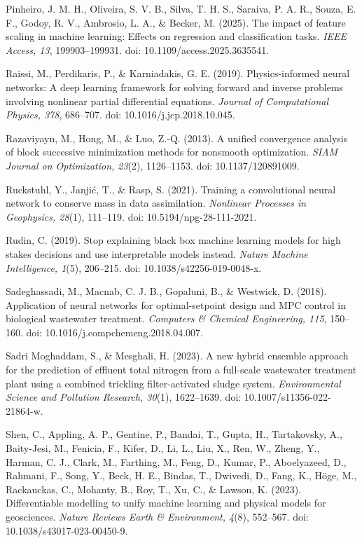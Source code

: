 \documentclass[a4paper,fleqn]{cas-sc}
\begin{document}
\noindent Pinheiro, J. M. H., Oliveira, S. V. B., Silva, T. H. S., Saraiva, P. A. R., Souza, E. F., Godoy, R. V., Ambrosio, L. A., \& Becker, M. (2025). The impact of feature scaling in machine learning: Effects on regression and classification tasks. \textit{IEEE Access, 13}, 199903--199931. doi: 10.1109/access.2025.3635541.

\noindent Raissi, M., Perdikaris, P., \& Karniadakis, G. E. (2019). Physics-informed neural networks: A deep learning framework for solving forward and inverse problems involving nonlinear partial differential equations. \textit{Journal of Computational Physics, 378}, 686--707. doi: 10.1016/j.jcp.2018.10.045.

\noindent Razaviyayn, M., Hong, M., \& Luo, Z.-Q. (2013). A unified convergence analysis of block successive minimization methods for nonsmooth optimization. \textit{SIAM Journal on Optimization, 23}(2), 1126--1153. doi: 10.1137/120891009.

\noindent Ruckstuhl, Y., Janji\'{c}, T., \& Rasp, S. (2021). Training a convolutional neural network to conserve mass in data assimilation. \textit{Nonlinear Processes in Geophysics, 28}(1), 111--119. doi: 10.5194/npg-28-111-2021.

\noindent Rudin, C. (2019). Stop explaining black box machine learning models for high stakes decisions and use interpretable models instead. \textit{Nature Machine Intelligence, 1}(5), 206--215. doi: 10.1038/s42256-019-0048-x.

\noindent Sadeghassadi, M., Macnab, C. J. B., Gopaluni, B., \& Westwick, D. (2018). Application of neural networks for optimal-setpoint design and MPC control in biological wastewater treatment. \textit{Computers \& Chemical Engineering, 115}, 150--160. doi: 10.1016/j.compchemeng.2018.04.007.

\noindent Sadri Moghaddam, S., \& Mesghali, H. (2023). A new hybrid ensemble approach for the prediction of effluent total nitrogen from a full-scale wastewater treatment plant using a combined trickling filter-activated sludge system. \textit{Environmental Science and Pollution Research, 30}(1), 1622--1639. doi: 10.1007/s11356-022-21864-w.

\noindent Shen, C., Appling, A. P., Gentine, P., Bandai, T., Gupta, H., Tartakovsky, A., Baity-Jesi, M., Fenicia, F., Kifer, D., Li, L., Liu, X., Ren, W., Zheng, Y., Harman, C. J., Clark, M., Farthing, M., Feng, D., Kumar, P., Aboelyazeed, D., Rahmani, F., Song, Y., Beck, H. E., Bindas, T., Dwivedi, D., Fang, K., H\"oge, M., Rackauckas, C., Mohanty, B., Roy, T., Xu, C., \& Lawson, K. (2023). Differentiable modelling to unify machine learning and physical models for geosciences. \textit{Nature Reviews Earth \& Environment, 4}(8), 552--567. doi: 10.1038/s43017-023-00450-9.
\end{document}
